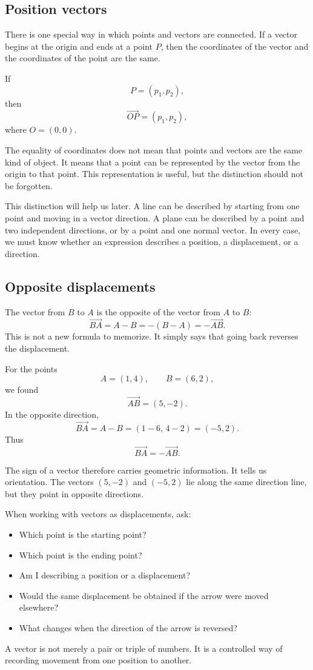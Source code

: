 \subsection*{Position vectors}

There is one special way in which points and vectors are connected. If a vector begins at the origin and ends at a point \(P\), then the coordinates of the vector and the coordinates of the point are the same.

If
\[
P=(p_1,p_2),
\]
then
\[
\overrightarrow{OP}=(p_1,p_2),
\]
where \(O=(0,0)\).

\begin{remarkbox}
The equality of coordinates does not mean that points and vectors are the same kind of object. It means that a point can be represented by the vector from the origin to that point. This representation is useful, but the distinction should not be forgotten.
\end{remarkbox}

This distinction will help us later. A line can be described by starting from one point and moving in a vector direction. A plane can be described by a point and two independent directions, or by a point and one normal vector. In every case, we must know whether an expression describes a position, a displacement, or a direction.

\subsection*{Opposite displacements}

The vector from \(B\) to \(A\) is the opposite of the vector from \(A\) to \(B\):
\[
\overrightarrow{BA}=A-B=-(B-A)=-\overrightarrow{AB}.
\]
This is not a new formula to memorize. It simply says that going back reverses the displacement.

\begin{examplebox}
For the points
\[
A=(1,4),
\qquad
B=(6,2),
\]
we found
\[
\overrightarrow{AB}=(5,-2).
\]
In the opposite direction,
\[
\overrightarrow{BA}=A-B=(1-6,\,4-2)=(-5,2).
\]
Thus
\[
\overrightarrow{BA}=-\overrightarrow{AB}.
\]
\end{examplebox}

The sign of a vector therefore carries geometric information. It tells us orientation. The vectors \((5,-2)\) and \((-5,2)\) lie along the same direction line, but they point in opposite directions.

\begin{summarybox}
When working with vectors as displacements, ask:
\begin{itemize}
\item Which point is the starting point?
\item Which point is the ending point?
\item Am I describing a position or a displacement?
\item Would the same displacement be obtained if the arrow were moved elsewhere?
\item What changes when the direction of the arrow is reversed?
\end{itemize}
\end{summarybox}

A vector is not merely a pair or triple of numbers. It is a controlled way of recording movement from one position to another.